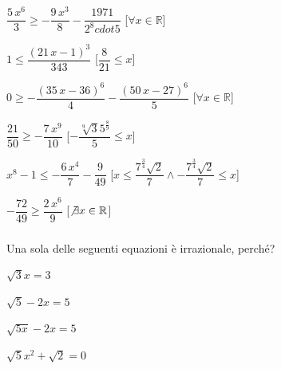 \begin{esercizio}
\begin{enumeratea}
\item ${\dfrac{5\,{x}^{6}}{3}}\geq -{\dfrac{9\,{x}^{3}}{8}}-{\dfrac
{1971}{2^8  cdot 5}}$ 
\hfill [$\forall x \in \mathbb{R}$]
\item $1\leq {\dfrac{ \left( 21\,x-1 \right) ^{3}}{343}}$ 
\hfill [${\dfrac{8}{21}}\leq x$]
\item $0\geq -{\dfrac{ \left( 35\,x-36 \right) ^{6}}{4}}-{\dfrac{ 
\left( 50\,x-27 \right) ^{6}}{5}}$ 
\hfill [$\forall x \in \mathbb{R}$]
\item ${\dfrac{21}{50}}\geq -{\dfrac{7\,{x}^{9}}{10}}$ 
\hfill [$-{\dfrac{\sqrt [9]{3}{5}^{{\frac{8}{9}}}}{5}}\leq x$]
\item ${x}^{8}-1\leq -{\dfrac{6\,{x}^{4}}{7}}-{\dfrac{9}{49}}$ 
\hfill [$x\leq {\dfrac{{7}^{{\frac{3}{4}}}\sqrt {2}}{7}} \wedge -{\dfrac
{{7}^{{\frac{3}{4}}}\sqrt {2}}{7}}\leq x$]
\item $-{\dfrac{72}{49}}\geq {\dfrac{2\,{x}^{6}}{9}}$ 
\hfill [$\not\exists x \in \mathbb{R}$]
\end{enumeratea}
\end{esercizio}


\subsubsection*{}


\begin{esercizio}\label{ese:03.1}
Una sola delle seguenti equazioni è irrazionale, perché?
\begin{multicols}{4}
\begin{enumeratea}
\item \(\sqrt{3} x = 3\)
\item \(\sqrt{5} -2x = 5\)
\item \(\sqrt{5x} -2x = 5\)
\item \(\sqrt{5}x^2 +\sqrt{2} = 0\)
\end{enumeratea}
\end{multicols}
\end{esercizio}


